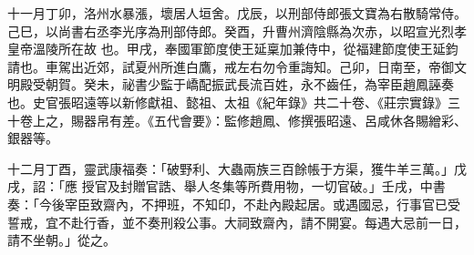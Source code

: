 \begin{pinyinscope}
 十一月丁卯，洛州水暴漲，壞居人垣舍。戊辰，以刑部侍郎張文寶為右散騎常侍。己巳，以尚書右丞李光序為刑部侍郎。癸酉，升曹州濟陰縣為次赤，以昭宣光烈孝皇帝溫陵所在故
 也。甲戌，奉國軍節度使王延稟加兼侍中，從福建節度使王延鈞請也。車駕出近郊，試夏州所進白鷹，戒左右勿令重誨知。己卯，日南至，帝御文明殿受朝賀。癸未，祕書少監于嶠配振武長流百姓，永不齒任，為宰臣趙鳳誣奏也。史官張昭遠等以新修獻祖、懿祖、太祖《紀年錄》共二十卷、《莊宗實錄》三十卷上之，賜器帛有差。《五代會要》：監修趙鳳、修撰張昭遠、呂咸休各賜繒彩、銀器等。



 十二月丁酉，靈武康福奏：「破野利、大蟲兩族三百餘帳于方渠，獲牛羊三萬。」戊戌，詔：「應
 授官及封贈官誥、舉人冬集等所費用物，一切官破。」壬戌，中書奏：「今後宰臣致齋內，不押班，不知印，不赴內殿起居。或遇國忌，行事官已受誓戒，宜不赴行香，並不奏刑殺公事。大祠致齋內，請不開宴。每遇大忌前一日，請不坐朝。」從之。



\end{pinyinscope}